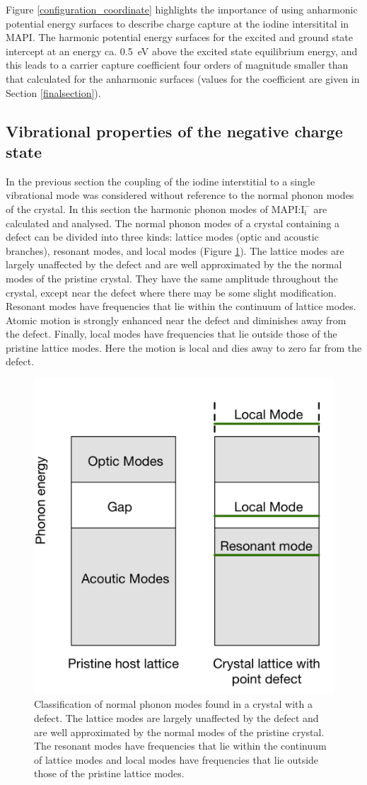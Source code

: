 Figure \ref{configuration_coordinate} highlights the importance of using anharmonic potential energy surfaces to describe charge capture at the iodine intersitital in MAPI. The harmonic potential energy surfaces for the excited and ground state intercept at an energy ca. \SI{0.5}{eV} above the excited state equilibrium energy, and this leads to a carrier capture coefficient four orders of magnitude smaller than that calculated for the anharmonic surfaces (values for the coefficient are given in Section \ref{finalsection}).

\subsection{Vibrational properties of the negative charge state}

In the previous section the coupling of the iodine interstitial to a single vibrational mode was considered without reference to the normal phonon modes of the crystal.
In this section the harmonic phonon modes of MAPI:$\mathrm{I}_\mathrm{i}^-$ are calculated and analysed.
The normal phonon modes of a crystal containing a defect can be divided into three kinds: lattice modes (optic and acoustic branches), resonant modes, and local modes (Figure \ref{defect_modes_schematic}).\autocite{Hayes1985}
The lattice modes are largely unaffected by the defect and are well approximated by the the normal modes of the pristine crystal. They have the same amplitude throughout the crystal, except near the defect where there may be some slight modification. 
Resonant modes have frequencies that lie within the continuum of lattice modes. Atomic motion is strongly enhanced near the defect and diminishes away from the defect.
Finally, local modes have frequencies that lie outside those of the pristine lattice modes. Here the motion is local and dies away to zero far from the defect.

\begin{figure}[h!]   
\centering
  \includegraphics[width=0.4\columnwidth]{figures/ch6/defect_modes_schematic.png}
  \caption[Classification of normal phonon modes found in a crystal with a defect]{Classification of normal phonon modes found in a crystal with a defect. The lattice modes are largely unaffected by the defect and are well approximated by the normal modes of the pristine crystal. The resonant modes have frequencies that lie within the continuum of lattice modes and local modes have frequencies that lie outside those of the pristine lattice modes.}
\label{defect_modes_schematic}
\end{figure}  %


